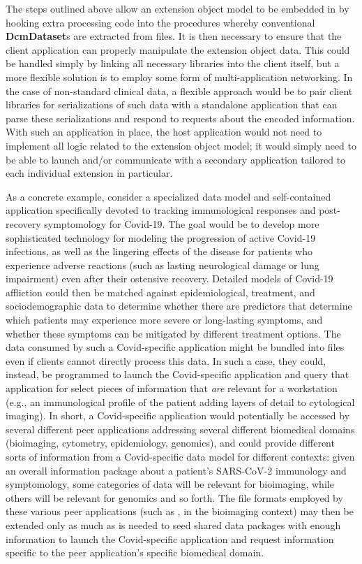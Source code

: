 \documentclass[11pt,letterpaper]{article}
\newcommand{\DCMTK}{\resizebox{!}{7pt}{\AcronymText{DCMTK}}}
\newcommand{\DICOM}{\resizebox{!}{7pt}{\AcronymText{DICOM}}}
\newcommand{\textscc}[1]{{\color{orr!35!black}{{%
						\fontfamily{Cabin-TLF}\fontseries{b}\selectfont{\textsc{\scriptsize{#1}}}}}}}
\newcommand{\AcronymText}[1]{{\textscc{#1}}}
\newcommand{\p}[1]{

\vspace{.9em}#1}
\begin{document}
{\p{The steps outlined above allow an extension object model to 
be embedded in \DICOM{} by hooking extra processing code 
into the procedures whereby conventional \textbf{DcmDataset}s  
are extracted from \DICOM{} files.  It is then necessary to 
ensure that the \DICOM{} client application can properly 
manipulate the extension object data.  This could be handled 
simply by linking all necessary libraries into the \DICOM{} client 
itself, but a more flexible solution is to employ some 
form of multi-application networking.  In the case 
of non-standard clinical data, a flexible approach would be 
to pair client libraries for serializations of such data 
with a standalone application that can parse these 
serializations and respond to requests about the encoded 
information.  With such an application in place, the 
\DCMTK{} host application would not need to implement 
all logic related to the extension object model; it 
would simply need to be able to launch and/or communicate 
with a secondary application tailored to each individual extension 
in particular.}

\p{As a concrete example, consider a specialized data model and 
self-contained application specifically devoted to tracking 
immunological responses and post-recovery symptomology 
for Covid-19.  The goal would be to develop more sophisticated 
technology for modeling the progression of active Covid-19 
infections, as well as the lingering effects of the disease 
for patients who experience adverse reactions (such 
as lasting neurological damage or lung impairment) even after their 
ostensive recovery.  Detailed models of Covid-19 affliction could then 
be matched against epidemiological, treatment, and sociodemographic 
data to determine whether there are predictors that determine which 
patients may experience more severe or long-lasting symptoms, 
and whether these symptoms can be mitigated by different treatment 
options.  The data consumed by such a Covid-specific application 
might be bundled into \DICOM{} files even if \DICOM{} clients 
cannot directly process this data.  In such a case, they could, 
instead, be programmed to launch the Covid-specific application 
and query that application for select pieces of information 
that \textit{are} relevant for a \DICOM{} workstation 
(e.g., an immunological profile of the patient adding 
layers of detail to cytological imaging).  In short, 
a Covid-specific application would potentially be accessed by 
several different peer applications addressing 
several different biomedical domains (bioimaging, cytometry, 
epidemiology, genomics), and could provide different 
sorts of information from a Covid-specific data model 
for different contexts: given an overall information 
package about a patient's SARS-CoV-2 immunology and symptomology, 
some categories of data will be relevant for bioimaging, 
while others will be relevant for 
genomics and so forth.  The file formats employed by 
these various peer applications (such as \DICOM{}, in the 
bioimaging context) may then be extended only as much 
as is needed to seed shared data packages with enough 
information to launch the Covid-specific application and 
request information specific to the peer application's 
specific biomedical domain.}

}
\end{document}
